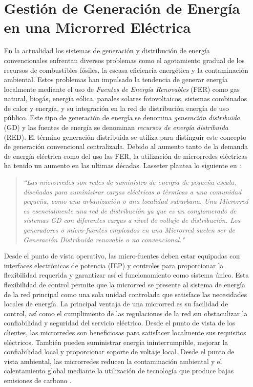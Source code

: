 \section{Gestión de Generación de Energía en una Microrred Eléctrica}
En la actualidad los sistemas de generación y distribución de energía convencionales enfrentan diversos problemas como el agotamiento gradual de los recursos de combustibles fósiles, la escasa eficiencia energética y la contaminación ambiental. Estos problemas han impulsado la tendencia de generar energía localmente mediante el uso de \textit{Fuentes de Energía Renovables} (FER) como gas natural, biogás, energía eólica, panales solares fotovoltaicos, sistemas combinados de calor y energía, y su integración en la red de distribución energía de uso público. Este tipo de generación de energía se denomina \textit{generación distribuida} (GD) y las fuentes de energía se denominan\textit{ recursos de energía distribuida }(RED). El término generación distribuida se utiliza para distinguir este concepto de generación convencional centralizada. Debido al aumento tanto de la demanda de energía eléctrica como del uso las FER, la utilización de microrredes eléctricas ha tenido un aumento en las ultimas décadas. Lasseter plantea lo siguiente en  \cite{lasseter2002microgrids}:
\begin{quote}
\textit{``Las microrredes son redes de suministro de energía de pequeña escala, diseñadas para suministrar cargas eléctricas o térmicas a una comunidad pequeña, como una urbanización o una localidad suburbana. Una Microrred es esencialmente una red de distribución ya que es un conglomerado de sistemas GD con diferentes cargas a nivel de voltaje de distribución. Los generadores o micro-fuentes empleados en una Microrred suelen ser de Generación Distribuida renovable o no convencional."}
\end{quote}


Desde el punto de vista operativo, las micro-fuentes deben estar equipadas con interfaces electrónicas de potencia (IEP) y controles para proporcionar la flexibilidad requerida y  garantizar así el funcionamiento como sistema único. Esta flexibilidad de control permite que la microrred se presente al sistema de energía de la red principal como una sola unidad controlada que satisface las necesidades locales de energía. La principal ventaja de una microrred es su facilidad de control, así como el cumplimiento de las regulaciones de la red sin obstaculizar la confiabilidad y seguridad del servicio eléctrico. Desde el punto de vista de los clientes, las microrredes son beneficiosas para satisfacer localmente sus requisitos eléctricos. También pueden suministrar energía ininterrumpible, mejorar la confiabilidad local y proporcionar soporte de voltaje local. Desde el punto de vista ambiental, las microrredes reducen la contaminación ambiental y el calentamiento global mediante la utilización de tecnología que produce bajas emisiones de carbono  \cite{lasseter2002microgrids}. 

